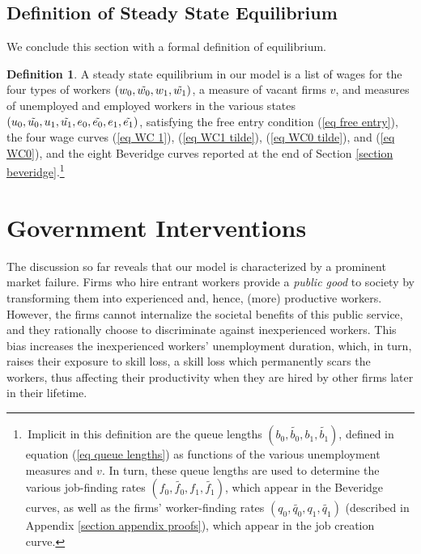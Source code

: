 \documentclass[12pt]{article} %
\theoremstyle{definition}
\newtheorem{definition}{Definition}%
\begin{document}
\subsection{Definition of Steady State Equilibrium}\label{section definition of equil} 

We conclude this section with a formal definition of equilibrium. 

\begin{definition}\label{definition equilibrium}
    A steady state equilibrium in our model is a list of wages for the four types of workers $(w_0, \Tilde{w_0}, w_1, \Tilde{w_1})$, a measure of vacant firms $v$, and measures of unemployed and employed workers in the various states $(u_0, \Tilde{u_0}, u_1, \Tilde{u_1}, e_0, \Tilde{e_0}, e_1, \Tilde{e_1})$, satisfying the free entry condition (\ref{eq free entry}), the four wage curves (\ref{eq WC 1}), (\ref{eq WC1 tilde}), (\ref{eq WC0 tilde}), and (\ref{eq WC0}), and the eight Beveridge curves reported at the end of Section \ref{section beveridge}.\footnote{\,Implicit in this definition are the queue lengths $(b_0,\tilde{b_0},b_1,\tilde{b_1})$, defined in equation (\ref{eq queue lengths}) as functions of the various unemployment measures and $v$. In turn, these queue lengths are used to determine the various job-finding rates $(f_0,\tilde{f_0},f_1,\tilde{f_1})$, which appear in the Beveridge curves, as well as the firms' worker-finding rates $(q_0,\tilde{q_0},q_1,\tilde{q_1})$ (described in Appendix \ref{section appendix proofs}), which appear in the job creation curve.}   
\end{definition} 





\section{Government Interventions}\label{section policy interventions}

The discussion so far reveals that our model is characterized by a prominent market failure. Firms who hire entrant workers provide a \textit{public good} to society by transforming them into experienced and, hence, (more) productive workers. However, the firms cannot internalize the societal benefits of this public service, and they rationally choose to discriminate against inexperienced workers. This bias increases the inexperienced workers' unemployment duration, which, in turn, raises their exposure to skill loss, a skill loss which permanently scars the workers, thus affecting their productivity when they are hired by other firms later in their lifetime.
\end{document}
